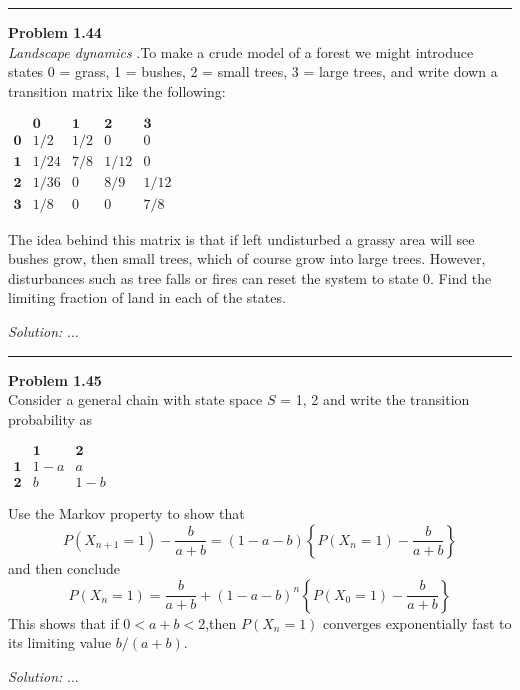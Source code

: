 \documentclass[a4paper, 11pt]{article}
\newenvironment{problem}[2][Problem]
    { \begin{mdframed}[backgroundcolor=gray!20] \textbf{#1 #2} \\}
    {  \end{mdframed}}
\newenvironment{solution}
    {\textit{Solution:}}
    {}
\begin{document}
\noindent\rule{7in}{2.8pt}
\begin{problem}{1.44}
    \textit{Landscape dynamics} .To make a crude model of a forest we might introduce states 0 = grass, 1 = bushes, 
    2 = small trees, 3 = large trees, and write down a transition matrix like the following:
    \begin{center}
        $       
       \begin{matrix}
             & \bm{0} & \bm{1} & \bm{2} & \bm{3} \\
           \bm{0} & 1/2 & 1/2 & 0 & 0 \\
           \bm{1} & 1/24 & 7/8 & 1/12 & 0 \\
           \bm{2} & 1/36 & 0 & 8/9 & 1/12 \\
           \bm{3} & 1/8 & 0 & 0 & 7/8 
           \end{matrix}
           $
   \end{center}
   The idea behind this matrix is that if left undisturbed a grassy area 
   will see bushes grow, then small trees, which of course grow into large trees. 
   However, disturbances such as tree falls or fires can reset the system to state 0. 
   Find the limiting fraction of land in each of the states.
\end{problem}
\begin{solution}
...
\end{solution}

\noindent\rule{7in}{2.8pt}
\begin{problem}{1.45}
    Consider a general chain with state space $S$ = {1, 2} and write the transition probability as
    \begin{center}
        $       
       \begin{matrix}
             & \bm{1} & \bm{2} \\
           \bm{1} & 1-a & a \\
           \bm{2} & b & 1-b 
           \end{matrix}
           $
   \end{center}
   Use the Markov property to show that
   $$P\left(X_{n+1}=1\right)-\frac{b}{a+b}=(1-a-b)\left\{P\left(X_{n}=1\right)-\frac{b}{a+b}\right\}$$
   and then conclude
   $$P\left(X_{n}=1\right)=\frac{b}{a+b}+(1-a-b)^n\left\{P\left(X_{0}=1\right)-\frac{b}{a+b}\right\}$$
   This shows that if $0 < a + b < 2$,then $P(X_n = 1)$ converges exponentially fast to its limiting value $b/(a + b)$.
\end{problem}
\begin{solution}
...
\end{solution}
\end{document}
